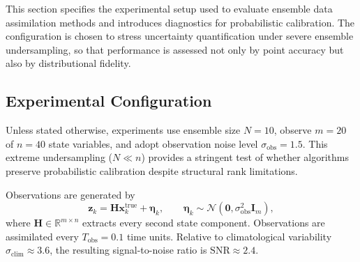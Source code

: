 \documentclass[11pt,a4paper]{article}
\begin{document}
This section specifies the experimental setup used to evaluate ensemble data assimilation methods and introduces diagnostics for probabilistic calibration. The configuration is chosen to stress uncertainty quantification under severe ensemble undersampling, so that performance is assessed not only by point accuracy but also by distributional fidelity.

\subsection{Experimental Configuration}\label{subsec:benchmark}

Unless stated otherwise, experiments use ensemble size $N=10$, observe $m=20$ of $n=40$ state variables, and adopt observation noise level $\sigma_{\mathrm{obs}}=1.5$. This extreme undersampling ($N\ll n$) provides a stringent test of whether algorithms preserve probabilistic calibration despite structural rank limitations.

Observations are generated by
\begin{equation}
\mathbf{z}_k=\mathbf{H}\mathbf{x}^{\mathrm{true}}_k+\boldsymbol{\eta}_k,
\qquad 
\boldsymbol{\eta}_k\sim\mathcal{N}(\mathbf{0},\sigma_{\mathrm{obs}}^2\mathbf{I}_m),
\end{equation}
where $\mathbf{H}\in\mathbb{R}^{m\times n}$ extracts every second state component. Observations are assimilated every $T_{\mathrm{obs}}=0.1$ time units. Relative to climatological variability $\sigma_{\mathrm{clim}}\approx3.6$, the resulting signal-to-noise ratio is $\mathrm{SNR}\approx2.4$.
\end{document}
